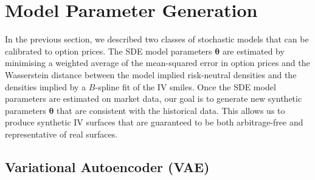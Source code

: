 \documentclass[onefignum,onetabnum]{siamonline190516}
\begin{document}
\section{Model Parameter Generation}

In the previous section, we described two classes of stochastic models that can be calibrated to option prices. The SDE model parameters $\boldsymbol{\theta}$ are estimated by minimising a weighted average of the mean-squared error in option prices and the Wasserstein distance between the model implied risk-neutral densities and the densities implied by a $B$-spline fit of the IV smiles.  Once the SDE model parameters are estimated on market data, our goal is to generate new synthetic parameters $\boldsymbol{\theta}$ that are consistent with the historical data. This allows us to produce synthetic IV surfaces that are guaranteed to be both arbitrage-free and representative of real surfaces. %

\subsection{Variational Autoencoder (VAE)}
\label{sec:vae}
\end{document}
